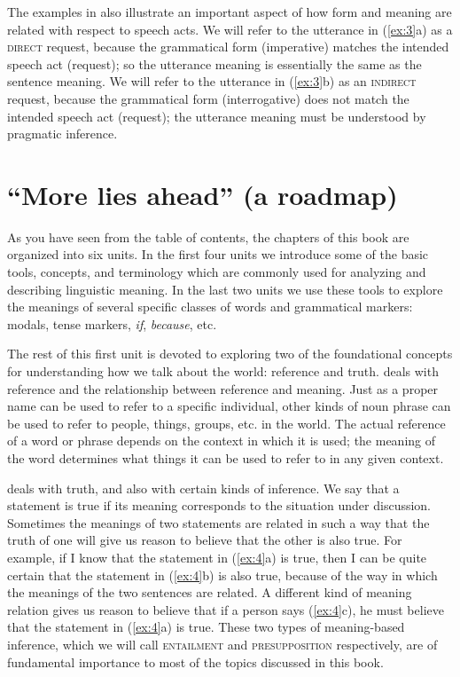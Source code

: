 The examples in  also illustrate an important aspect of how form and meaning are related with respect to speech acts. We will refer to the utterance in (\ref{ex:3}a) as a \textsc{direct} request, because the grammatical form (imperative) matches the intended speech act (request); so the utterance meaning is essentially the same as the sentence meaning. We will refer to the utterance in (\ref{ex:3}b) as an \textsc{indirect} request, because the grammatical form (interrogative) does not match the intended speech act (request); the utterance meaning must be understood by pragmatic inference.


\section{“More lies ahead” (a roadmap)}\label{sec:} %

As you have seen from the table of contents, the chapters of this book are organized into six units. In the first four units we introduce some of the basic tools, concepts, and terminology which are commonly used for analyzing and describing linguistic meaning. In the last two units we use these tools to explore the meanings of several specific classes of words and grammatical markers: modals, tense markers, \textit{if}, \textit{because}, etc.



The rest of this first unit is devoted to exploring two of the foundational concepts for understanding how we talk about the world: reference and truth.  deals with reference and the relationship between reference and meaning. Just as a proper name can be used to refer to a specific individual, other kinds of noun phrase can be used to refer to people, things, groups, etc. in the world. The actual reference of a word or phrase depends on the context in which it is used; the meaning of the word determines what things it can be used to refer to in any given context.



 deals with truth, and also with certain kinds of inference. We say that a statement is true if its meaning corresponds to the situation under discussion. Sometimes the meanings of two statements are related in such a way that the truth of one will give us reason to believe that the other is also true. For example, if I know that the statement in (\ref{ex:4}a) is true, then I can be quite certain that the statement in (\ref{ex:4}b) is also true, because of the way in which the meanings of the two sentences are related. A different kind of meaning relation gives us reason to believe that if a person says (\ref{ex:4}c), he must believe that the statement in (\ref{ex:4}a) is true. These two types of meaning-based inference, which we will call \textsc{entailment} and \textsc{presupposition} respectively, are of fundamental importance to most of the topics discussed in this book.


